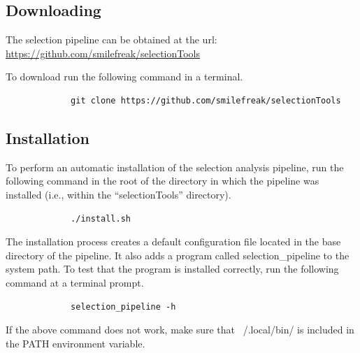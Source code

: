 \documentclass[a4paper,10pt]{article}
\begin{document}
             \subsection{Downloading}
             The selection pipeline can be obtained at the url:
             \href{https://github.com/smilefreak/selectionTools}
             {https://github.com/smilefreak/selectionTools}

             \noindent
             To download run the following command in a terminal.

             \begin{verbatim}
             git clone https://github.com/smilefreak/selectionTools
             \end{verbatim}

             \subsection{Installation}

             \noindent
             To perform an automatic installation of the selection
             analysis pipeline, run the following command in the root of the
             directory in which the pipeline was installed (i.e., within the
             ``selectionTools'' directory).\\
             \begin{verbatim}
             ./install.sh
             \end{verbatim}

             \noindent
             The installation process creates a default configuration file located in the base
             directory of the pipeline. It also adds a program called
             selection\_pipeline to the system path. To test that the program is
             installed correctly, run the following command at a terminal prompt.

             \begin{verbatim}
             selection_pipeline -h
             \end{verbatim}

             \noindent
             If the above command does not work, make sure that ~/.local/bin/ is included in the PATH environment variable.
\end{document}
